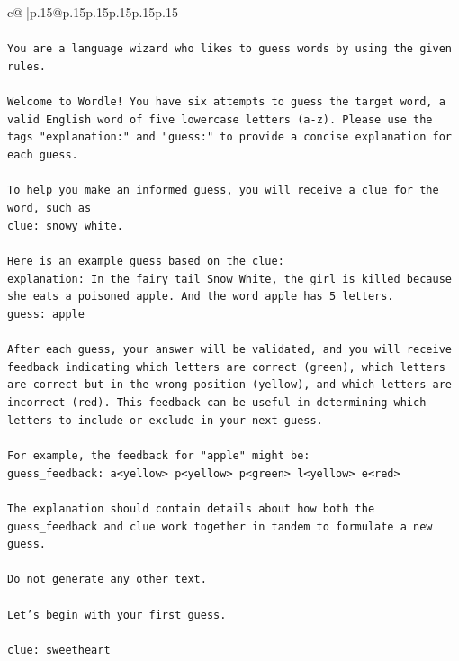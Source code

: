 \documentclass{article}
\begin{document}
{\begin{supertabular}{c@{$\;$}|p{.15\linewidth}@{}p{.15\linewidth}p{.15\linewidth}p{.15\linewidth}p{.15\linewidth}p{.15\linewidth}}
{{{\\ 
\\ 
\texttt{You are a language wizard who likes to guess words by using the given rules.} \\
\\ 
\texttt{Welcome to Wordle! You have six attempts to guess the target word, a valid English word of five lowercase letters (a{-}z). Please use the tags "explanation:" and "guess:" to provide a concise explanation for each guess.} \\
\\ 
\texttt{To help you make an informed guess, you will receive a clue for the word, such as} \\
\texttt{clue: snowy white.} \\
\\ 
\texttt{Here is an example guess based on the clue:} \\
\texttt{explanation: In the fairy tail Snow White, the girl is killed because she eats a poisoned apple. And the word apple has 5 letters.} \\
\texttt{guess: apple} \\
\\ 
\texttt{After each guess, your answer will be validated, and you will receive feedback indicating which letters are correct (green), which letters are correct but in the wrong position (yellow), and which letters are incorrect (red). This feedback can be useful in determining which letters to include or exclude in your next guess.} \\
\\ 
\texttt{For example, the feedback for "apple" might be:} \\
\texttt{guess\_feedback: a<yellow> p<yellow> p<green> l<yellow> e<red>} \\
\\ 
\texttt{The explanation should contain details about how both the guess\_feedback and clue work together in tandem to formulate a new guess.} \\
\\ 
\texttt{Do not generate any other text.} \\
\\ 
\texttt{Let's begin with your first guess.} \\
\\ 
\texttt{clue: sweetheart} \\
            }
        }
    }
     \\ \\


\end{supertabular}}
\end{document}
